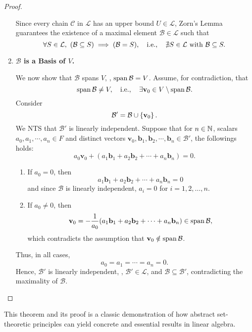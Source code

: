 \documentclass[11pt,openany]{article}
\renewcommand{\vec}[1]{\mathbf{#1}}
\begin{document}
\begin{proof}
\begin{enumerate}[Step 1]
				Since every chain $\mathcal{C}$ in $\mathcal{L}$ has an upper bound $U\in\mathcal{L}$, Zorn's Lemma guarantees the existence of a maximal element $\mathcal{B}\in\mathcal{L}$ such that \[
				\forall S\in\mathcal{L},\ (\mathcal{B}\subseteq S)\implies (\mathcal{B}=S),\quad\ie,\quad\nexists S\in\mathcal{L}\ \text{with}\ \mathcal{B}\subseteq S.
				\]
				\item \textbf{$\mathcal{B}$ is a Basis of $V$.}
				
				We now show that $\mathcal{B}$ spans $V$, \ie, $\operatorname{\normalfont span}\mathcal{B}=V$. Assume, for contradiction, that \[
				\Span\mathcal{B}\neq V,\quad\ie,\quad\exists\vec{v}_0\in V\setminus\Span\mathcal{B}.
				\] Consider \[
				\mathcal{B}'=\mathcal{B}\cup\set{\vec{v}_0}.
				\] We NTS that $\mathcal{B}'$ is linearly independent. Suppose that for $n\in\mathbb{N}$, scalars $a_0,a_1,\cdots,a_n\in F$ and distinct vectors $\vec{v}_0,\vec{b}_1,\vec{b}_2,\cdots,\vec{b}_n\in\mathcal{B}'$, the followings holds: \[
				a_0\vec{v}_0+(a_1\vec{b}_1+a_2\vec{b}_2+\cdots+a_n\vec{b}_n)=0.
				\] \begin{enumerate}
						\item If $a_0=0$, then \[
						a_1\vec{b}_1+a_2\vec{b}_2+\cdots+a_n\vec{b}_n=0
						\] and since $\mathcal{B}$ is linearly independent, $a_i=0$ for $i=1,2,\dots, n$.
						\item If $a_0\neq 0$, then \[
						\vec{v}_0=-\frac{1}{a_0}(a_1\vec{b}_1+a_2\vec{b}_2+\cdots+a_n\vec{b}_n)\in\Span\mathcal{B},
						\] which contradicts the assumption that $\vec{v}_0\notin\Span\mathcal{B}$.
					\end{enumerate}
				Thus, in all cases, \[
				a_0=a_1=\cdots=a_n=0.
				\] Hence, $\mathcal{B}'$ is linearly independent, \ie, $\mathcal{B}'\in\mathcal{L}$, and $\mathcal{B}\subseteq\mathcal{B}'$, contradicting the maximality of $\mathcal{B}$.
			\end{enumerate}
	
\end{proof}
\begin{remark*}
	This theorem and its proof is a classic demonstration of how abstract set-theoretic principles can yield concrete and essential results in linear algebra.
\end{remark*}
\end{document}
